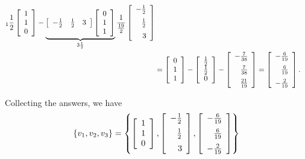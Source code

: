 \begin{align*}
{		   }_{1}
		\frac{1}{2}
		   \left[ \begin{array}{c} 1 \\ 1 \\ 0 \end{array} \right]
		- \underbrace{%
		   \left[ \begin{array}{ccc}
			-\frac{1}{2} & \frac{1}{2} & 3 \end{array} \right]
		   \left[ \begin{array}{c} 0 \\ 1 \\ 1 \end{array} \right]%
		   }_{3\frac{1}{2}}
		\frac{1}{\frac{19}{2}}
		   \left[ \begin{array}{r}
			-\frac{1}{2} \medskip \\ \frac{1}{2} \medskip \\ 3 \end{array} \right] \\
		&= \left[ \begin{array}{c} 0 \\ 1 \\ 1 \end{array} \right]
		- \left[ \begin{array}{c}
			\frac{1}{2} \\ \frac{1}{2} \\ 0 \end{array} \right]
		- \left[ \begin{array}{r}
			-\frac{7}{38} \medskip \\ \frac{7}{38} \medskip \\ \frac{21}{19}
			\end{array} \right]
		= \left[ \begin{array}{r}
			-\frac{6}{19} \medskip \\ \frac{6}{19} \medskip \\ -\frac{2}{19}
			\end{array} \right].
	\end{align*}
	
	Collecting the answers, we have
	\begin{equation*}
	\{ v_1, v_2, v_3\} = \left\{
		\left[ \begin{array}{c} 1 \\ 1 \\ 0 \end{array} \right],
		\left[ \begin{array}{r} -\frac{1}{2}  \medskip \\ \frac{1}{2} \medskip \\ 3 \end{array} \right],
	 \left[ \begin{array}{r}
			-\frac{6}{19} \medskip \\ \frac{6}{19} \medskip \\ -\frac{2}{19}
			\end{array} \right]
		\right\}
\end{equation*}

